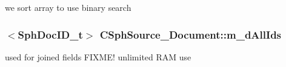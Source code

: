 we sort array to use binary search 

\hypertarget{classCSphSource__Document_a82b275f02ed3fa2a1db38752d8002d0a}{
\subsubsection[{m\-\_\-d\-All\-Ids}]{$<${\bf Sph\-Doc\-I\-D\-\_\-t}$>$ C\-Sph\-Source\-\_\-\-Document\-::m\-\_\-d\-All\-Ids\hspace{0.3cm}{\ttfamily [protected]}}}\label{classCSphSource__Document_a82b275f02ed3fa2a1db38752d8002d0a}


used for joined fields F\-I\-X\-M\-E! unlimited R\-A\-M use 

